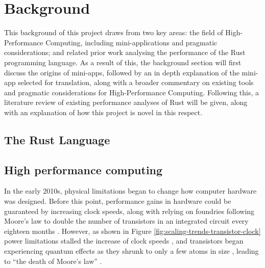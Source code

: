 \chapter{Background}
\label{ch:background}

This background of this project draws from two key areas: the field of High-Performance Computing, including mini-applications  and pragmatic considerations; and related prior work analysing the performance of the Rust programming language. As a result of this, the background section will first discuss the origins of mini-apps, followed by an in depth explanation of the mini-app selected for translation, along with a broader commentary on existing tools and pragmatic considerations for High-Performance Computing. Following this, a literature review of existing performance analyses of Rust will be given, along with an explanation of how this project is novel in this respect.


\section{The Rust Language}
\label{sec:rust} %




\section{High performance computing}
\label{sec:hpc} %


In the early 2010s, physical limitations began to change how computer hardware was designed. Before this point, performance gains in hardware could be guaranteed by increasing clock speeds, along with relying on foundries following Moore's law to double the number of transistors in an integrated circuit every eighteen months \cite{}. However, as shown in Figure \ref{fig:scaling-trends-transistor-clock} power limitations stalled the increase of clock speeds \cite{}, and transistors began experiencing quantum effects as they shrunk to only a few atoms in size \cite{}, leading to ``the death of Moore's law'' \cite{}.

